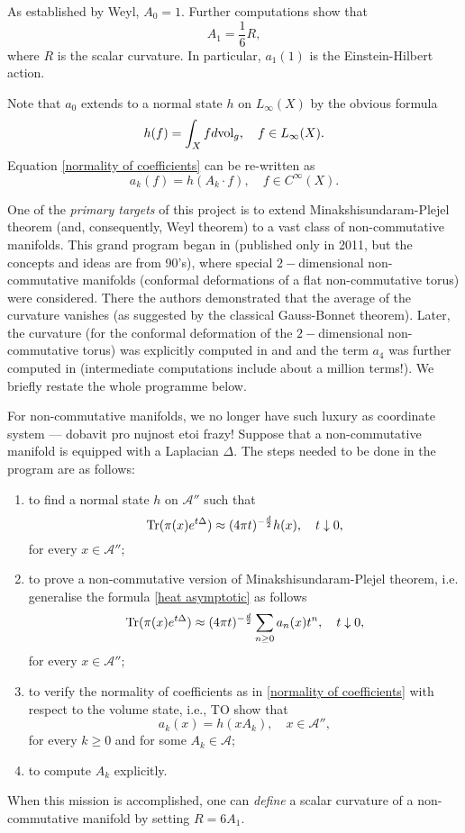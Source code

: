 \documentclass{article}
\begin{document}
As established by Weyl, $A_0=1.$ Further computations show that
$$A_1=\frac16 R,$$
where $R$ is the scalar curvature. In particular, $a_1(1)$ is the Einstein-Hilbert action.

Note that $a_0$ extends to a normal state $h$ on $L_{\infty}(X)$ by the obvious formula
$$h(f)=\int_X fd{\rm vol}_g,\quad f\in L_{\infty}(X).$$
Equation \eqref{normality of coefficients} can be re-written as
$$a_k(f)=h(A_k\cdot f),\quad f\in C^{\infty}(X).$$

One of the {\it primary targets} of this project is to extend Minakshisundaram-Plejel theorem (and, consequently, Weyl theorem) to a vast class of non-commutative manifolds. This grand program began in \cite{ConnesTretkoff} (published only in 2011, but the concepts and ideas are from 90's), where special $2-$dimensional non-commutative manifolds (conformal deformations of a flat non-commutative torus) were considered. There the authors demonstrated that the average of the curvature vanishes (as suggested by the classical Gauss-Bonnet theorem). Later, the curvature (for the conformal deformation of the $2-$dimensional non-commutative torus) was explicitly computed in \cite{ConnesMoscovici_curvature} and \cite{FathizadehKhalkhali} and the term $a_4$ was further computed in \cite{ConnesFathizadeh} (intermediate computations include about a million terms!). We briefly restate the whole programme below.  

For non-commutative manifolds, we no longer have such luxury as coordinate system --- dobavit pro nujnost etoi frazy! Suppose that a non-commutative manifold is equipped with a Laplacian $\Delta.$ The steps needed to be done in the program are as follows:
\begin{enumerate}
\item\label{raph1} to find a normal state $h$ on $\mathcal{A}''$ such that
\begin{equation}\label{raph1 eq}
{\rm Tr}(\pi(x)e^{t\Delta})\approx (4\pi t)^{-\frac{d}{2}} h(x),\quad t\downarrow0,
\end{equation}
for every $x\in\mathcal{A}'';$
\item\label{raph2} to prove a non-commutative version of Minakshisundaram-Plejel theorem, i.e. generalise the formula \eqref{heat asymptotic} as follows
$${\rm Tr}(\pi(x)e^{t\Delta})\approx (4\pi t)^{-\frac{d}{2}} \sum_{n\geq0}a_n(x)t^n,\quad t\downarrow0,$$
for every $x\in\mathcal{A}'';$
\item\label{raph3} to verify the normality of coefficients as in \eqref{normality of coefficients} with respect to the volume state, i.e., TO show that
$$a_k(x)=h(xA_k),\quad x\in\mathcal{A}'',$$
for every $k\geq0$ and for some $A_k\in\mathcal{A};$ 
\item\label{raph4} to compute $A_k$ explicitly.
\end{enumerate}
When this mission is accomplished, one can {\it define} a scalar curvature of a non-commutative manifold by setting $R=6A_1.$
\end{document}
